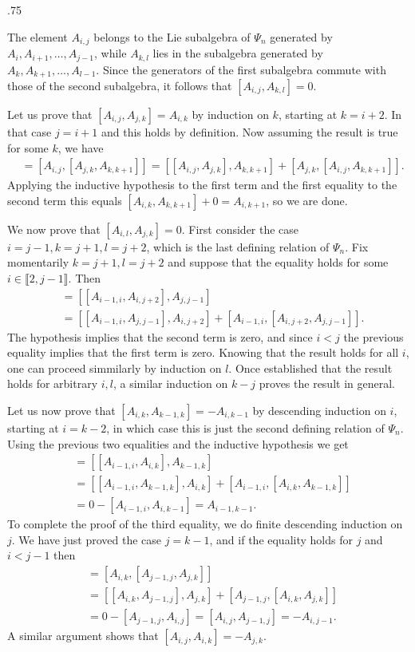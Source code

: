\documentclass[11pt,fleqn]{amsart}
\makeatletter
\renewcommand\proofname{Proof}
\renewenvironment{proof}[1][\textit{\proofname}]{\par
 \pushQED{\qed}%
 \normalfont \topsep.75\paraskip\relax
 \trivlist
 \item[\hskip\labelsep
 \itshape
 #1\@addpunct{.}]\ignorespaces
}{%
 \popQED\endtrivlist\@endpefalse
}
\newcounter{para}[section]
\newcommand\interval[1]{\llbracket #1 \rrbracket}
\makeatother
\begin{document}
\begin{proof}
The element $A_{i,j}$ belongs to the Lie subalgebra of $\Psi_n$ generated by
$A_i, A_{i+1}, \ldots, A_{j-1}$, while $A_{k,l}$ lies in the subalgebra 
generated by $A_k, A_{k+1}, \ldots, A_{l-1}$. Since the generators of the first
subalgebra commute with those of the second subalgebra, it follows that 
$[A_{i,j}, A_{k,l}] = 0$.

Let us prove that $[A_{i,j}, A_{j,k}] = A_{i,k}$ by induction on $k$, starting
at $k = i+2$. In that case $j = i+1$ and this holds by definition. Now 
assuming the result is true for some $k$, we have
\begin{align*}
[A_{i,j}, A_{j,k+1}]
	&= [A_{i,j}, [A_{j,k}, A_{k,k+1}]]
	= [[A_{i,j}, A_{j,k}], A_{k,k+1}] + [A_{j,k},[A_{i,j}, A_{k,k+1}]].
\end{align*}
Applying the inductive hypothesis to the first term and the first equality to
the second term this equals $[A_{i,k}, A_{k,k+1}] + 0 = A_{i,k+1}$, so we are 
done.

We now prove that $[A_{i,l}, A_{j,k}] = 0$. First consider the case $i = j-1, 
k = j+1, l = j+2$, which is the last defining relation of $\Psi_n$. Fix 
momentarily $k = j+1, l = j+2$ and suppose that the equality holds for some 
$i \in \interval{2, j-1}$. Then
\begin{align*}
[A_{i-1,j+2}, A_{j,j+1}]
	&=[[A_{i-1,i}, A_{i,j+2}], A_{j,j-1}] \\
	&=[[A_{i-1,i}, A_{j,j-1}], A_{i,j+2}] + [A_{i-1,i}, [A_{i,j+2},A_{j,j-1}]].
\end{align*}
The hypothesis implies that the second term is zero, and since $i < j$ the 
previous equality implies that the first term is zero. Knowing that the result
holds for all $i$, one can proceed simmilarly by induction on $l$. Once 
established that the result holds for arbitrary $i,l$, a similar induction on
$k-j$ proves the result in general.

Let us now prove that $[A_{i,k}, A_{k-1,k}] = - A_{i,k-1}$ by descending 
induction on $i$, starting at $i = k-2$, in which case this is just the second 
defining relation of $\Psi_n$. Using the previous two equalities and the
inductive hypothesis we get
\begin{align*}
[A_{i-1,k}, A_{k-1,k}]
	&= [[A_{i-1,i}, A_{i,k}], A_{k-1, k}]\\
	&= [[A_{i-1,i}, A_{k-1,k}], A_{i,k}] + [A_{i-1,i}, [A_{i,k}, A_{k-1,k}]] \\
	&= 0 - [A_{i-1,i}, A_{i,k-1}] = A_{i-1, k-1}.
\end{align*}
To complete the proof of the third equality, we do finite descending induction
on $j$. We have just proved the case $j = k-1$, and if the equality holds for
$j$ and $i < j-1$ then
\begin{align*}
[A_{i,k}, A_{j-1, k}]
	&= [A_{i,k}, [A_{j-1,j}, A_{j,k}]] \\
	&= [[A_{i,k}, A_{j-1,j}], A_{j,k}] + [A_{j-1,j},[A_{i,k}, A_{j,k}]] \\
	&= 0 - [A_{j-1,j}, A_{i,j}] = [A_{i,j}, A_{j-1,j}] = - A_{i,j-1}.
\end{align*}
A similar argument shows that $[A_{i,j}, A_{i,k}] = - A_{j,k}$.


\end{proof}
\end{document}
